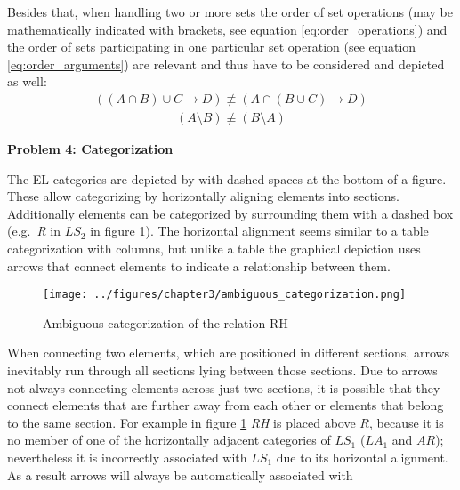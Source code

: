 \documentclass[twoside, openright, 12pt]{book}
\begin{document}
\noindent
Besides that, when handling two or more sets the order of set operations (may be mathematically indicated with brackets, see equation \ref{eq:order_operations}) and the order of sets participating in one particular set operation (see equation \ref{eq:order_arguments}) are relevant and thus have to be considered and depicted as well:
\begin{equation}
\begin{gathered}
((A \cap B) \cup C \rightarrow D) \not\equiv
(A \cap (B \cup C) \rightarrow D)
\end{gathered}\label{eq:order_operations}
\end{equation}
\vspace{-8mm}
\begin{equation}
\begin{gathered}
(A \setminus B) \not\equiv (B \setminus A) 
\end{gathered}\label{eq:order_arguments}
\end{equation}



\noindent
\textbf{Problem 4: Categorization}
\vspace{1mm}

\noindent
The EL categories are depicted by \cite{Amthor18} with dashed spaces at the bottom of a figure.
These allow categorizing by horizontally aligning elements into sections.
Additionally elements can be categorized by surrounding them with a dashed box (e.g.~\textit{R} in $LS_2$ in figure \ref{fig:ambiguous_categorization}).
The horizontal alignment seems similar to a table categorization with columns, but unlike a table the graphical depiction uses arrows that connect elements to indicate a relationship between them.

\begin{figure}[htb]
	\centering
	\texttt{[image: ../figures/chapter3/ambiguous\_categorization.png]}
	\caption{Ambiguous categorization of the relation RH}
	\label{fig:ambiguous_categorization}
\end{figure}

\noindent
When connecting two elements, which are positioned in different sections, arrows inevitably run through all sections lying between those sections.
Due to arrows not always connecting elements across just two sections, it is possible that they connect elements that are further away from each other or elements that belong to the same section.
For example in figure \ref{fig:ambiguous_categorization} \textit{RH} is placed above $R$, because it is no member of one of the horizontally adjacent categories of $LS_1$ ($LA_1$ and $AR$); nevertheless it is incorrectly associated with $LS_1$ due to its horizontal alignment.
As a result arrows will always be automatically associated with
\end{document}
